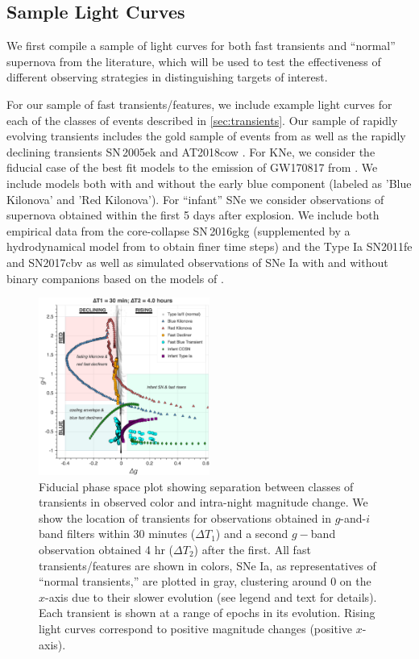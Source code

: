 \documentclass[letterpaper,longauthor,trackchanges,twocolumn,onecolappendix,sort&compress]{aastex62}
\newcommand{\dtone}{\ensuremath{\Delta T_1}}
\newcommand{\dttwo}{\ensuremath{\Delta T_2}}
\begin{document}
\subsection{Sample Light Curves}

We first compile a sample of light curves for both fast transients and ``normal'' supernova from the literature, which will be used to test the effectiveness of different observing strategies in distinguishing targets of interest. 

For our sample of fast transients/features, we include example light curves for each of the classes of events described in \autoref{sec:transients}.
Our sample of rapidly evolving transients includes the gold sample of events from \cite{Drout2014} as well as the rapidly declining transients SN\,2005ek \citep{Drout2013} and AT2018cow \citep{Margutti2018}. For KNe, we consider the fiducial case of the best fit models to the emission of GW170817 from \citet{Villar2017}. We include models both with and without the early blue component (labeled as 'Blue Kilonova' and 'Red Kilonova'). For ``infant'' SNe we consider observations of supernova obtained within the first 5 days after explosion. We include both empirical data from the core-collapse SN\,2016gkg (supplemented by a hydrodynamical model from \citealt{Piro2016} to obtain finer time steps) and the Type Ia SN2011fe and SN2017cbv \citep{Graham2015,Hosseinzadeh2017} as well as simulated observations of SNe Ia with and without binary companions based on the models of \citet{Kasen2010}.

\begin{figure}[!t]
\begin{center}
\includegraphics[width=0.5\textwidth]{figures/LSST_PhaseSpace.png}
\caption{Fiducial phase space plot showing separation between classes of transients in observed color and intra-night magnitude change. We show the location of transients for observations obtained in $g$-and-$i$ band filters within 30 minutes (\dtone) and a second $g-$band observation obtained 4 hr (\dttwo) after the first. All fast transients/features are shown in colors, SNe Ia, as representatives of ``normal transients,'' are plotted in gray, clustering around 0 on the $x$-axis due to their slower evolution (see legend and text for details). Each transient is shown at a range of epochs in its evolution. Rising light curves correspond to positive magnitude changes (positive $x$-axis).  }\label{fig:phasespace}
\end{center}
\end{figure}
\end{document}
